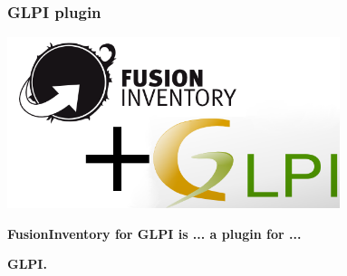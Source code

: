 %
\begin{frame}
    \frametitle{GLPI plugin}

   \includegraphics[height=5cm]{./pics/fusinvglpi.png}

    \bf{FusionInventory for GLPI} is ... a plugin for ...

    \bf{GLPI}.
\end{frame}

